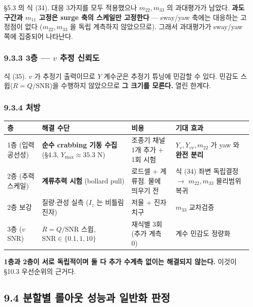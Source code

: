 \documentclass[10pt,a4paper]{article}
\begin{document}
\S{}5.3 의 식 (34). 대응 3가지를 모두 적용했으나 $m_{22}, m_{33}$ 의 과대평가가 남았다. \textbf{과도구간과 $m_{11}$ 고정은 surge 축의 스케일만 고정한다} --- sway/yaw 축에는 대응하는 고정점이 없다 ($m_{22}, m_{33}$ 을 독립 계측하지 않았으므로). 그래서 과대평가가 sway/yaw 쪽에 집중되어 나타난다.

\subsubsection*{9.3.3 3층 --- $v$ 추정 신뢰도}

식 (35). $v$ 가 추정기 출력이므로 $Y$ 계수군은 추정기 튜닝에 민감할 수 있다. 민감도 스윕($R = Q/\mathrm{SNR}$)을 수행하지 않았으므로 \textbf{그 크기를 모른다.} 열린 한계다.

\subsubsection*{9.3.4 처방}

\begin{center}\footnotesize\setlength{\tabcolsep}{3pt}
\begin{tabular}{@{}lp{4.27cm}p{3.15cm}p{4.78cm}@{}}
\toprule
\textbf{층} & \textbf{해결 수단} & \textbf{비용} & \textbf{기대 효과} \\
\midrule
1층 (입력 공선성) & \textbf{순수 crabbing 기동 수집} (\S{}4.3, $Y_{\max} \approx 35.3$ N) & 조종기 채널 1개 추가 + 1회 시험 & $Y_v, Y_{vv}, m_{22}$ 가 yaw 와 \textbf{완전 분리} \\
2층 (추력 스케일) & \textbf{계류추력 시험} (bollard pull) & 로드셀 + 계류점. 물에 띄우기 전 & 식 (34) 좌변 독립결정 $\to$ $m_{22}, m_{33}$ 물리범위 복귀 \\
2층 보강 & 질량$\cdot$관성 실측 ($I_z$ 는 비틀림 진자) & 저울 + 진자 치구 & $m_{33}$ 교차검증 \\
3층 ($v$ SNR) & $R = Q/\mathrm{SNR}$ 스윕, $\mathrm{SNR} \in \{0.1, 1, 10\}$ & 재식별 3회 (추가 계측 0) & 계수 민감도 정량화 \\
\bottomrule
\end{tabular}
\end{center}

\textbf{1층과 2층이 서로 독립적이며 둘 다 추가 수계측 없이는 해결되지 않는다.} 이것이 \S{}10.3 우선순위의 근거다.

\subsection*{9.4 분할별 롤아웃 성능과 일반화 판정}
\end{document}
